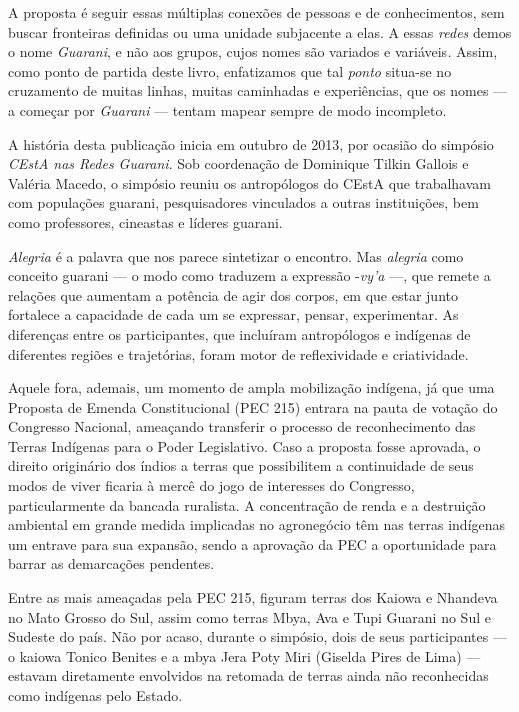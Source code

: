 A proposta é seguir essas múltiplas conexões de pessoas e de
conhecimentos, sem buscar fronteiras definidas ou uma unidade subjacente
a elas. A essas \emph{redes} demos o nome \emph{Guarani}, e não aos
grupos, cujos nomes são variados e variáveis\emph{.} Assim, como ponto
de partida deste livro, enfatizamos que tal \emph{ponto} situa-se no
cruzamento de muitas linhas, muitas caminhadas e experiências, que os
nomes --- a começar por \emph{Guarani} --- tentam mapear sempre de modo
incompleto.

A história desta publicação inicia em outubro de 2013, por ocasião do
simpósio \emph{CEstA nas Redes Guarani}. Sob coordenação de Dominique
Tilkin Gallois e Valéria Macedo, o simpósio reuniu os antropólogos do
CEstA que trabalhavam com populações guarani, pesquisadores vinculados a
outras instituições, bem como professores, cineastas e líderes guarani.

\emph{Alegria} é a palavra que nos parece sintetizar o encontro. Mas
\emph{alegria} como conceito guarani --- o modo como traduzem a
expressão -\emph{vy'a} ---, que remete a relações que aumentam a
potência de agir dos corpos, em que estar junto fortalece a capacidade
de cada um se expressar, pensar, experimentar. As diferenças entre os
participantes, que incluíram antropólogos e indígenas de diferentes
regiões e trajetórias, foram motor de reflexividade e criatividade.

Aquele fora, ademais, um momento de ampla mobilização indígena, já que
uma Proposta de Emenda Constitucional (PEC 215) entrara na pauta de
votação do Congresso Nacional, ameaçando transferir o processo de
reconhecimento das Terras Indígenas para o Poder Legislativo. Caso a
proposta fosse aprovada, o direito originário dos índios a terras que
possibilitem a continuidade de seus modos de viver ficaria à mercê do
jogo de interesses do Congresso, particularmente da bancada ruralista. A
concentração de renda e a destruição ambiental em grande medida
implicadas no agronegócio têm nas terras indígenas um entrave para sua
expansão, sendo a aprovação da PEC a oportunidade para barrar as
demarcações pendentes.

Entre as mais ameaçadas pela PEC 215, figuram terras dos Kaiowa e
Nhandeva no Mato Grosso do Sul, assim como terras Mbya, Ava e Tupi
Guarani no Sul e Sudeste do país. Não por acaso, durante o simpósio,
dois de seus participantes --- o kaiowa Tonico Benites e a mbya Jera
Poty Miri (Giselda Pires de Lima) --- estavam diretamente envolvidos na
retomada de terras ainda não reconhecidas como indígenas pelo Estado.

